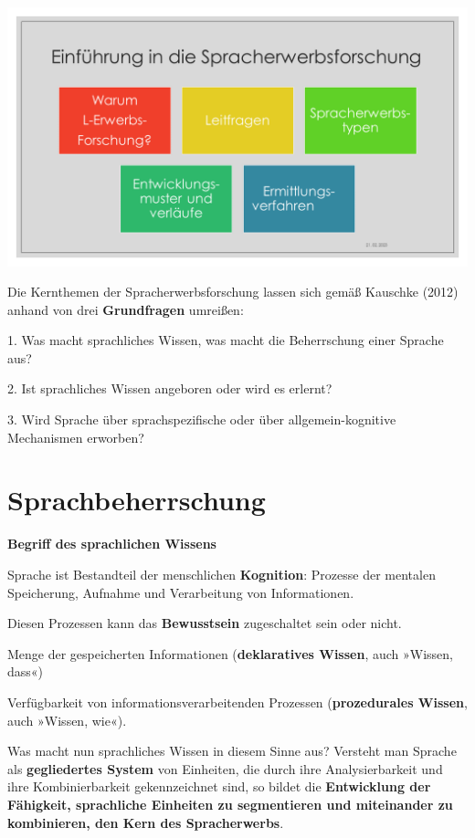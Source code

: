 \documentclass[
  letterpaper,
]{scrbook}
\begin{document}
\includegraphics[width=1\textwidth,height=\textheight]{./pictures/UJ_Intro_2023_02.png}

Die Kernthemen der Spracherwerbsforschung lassen sich gemäß Kauschke
(2012) anhand von drei \textbf{Grundfragen} umreißen:

1. Was macht sprachliches Wissen, was macht die Beherrschung einer
Sprache aus?

2. Ist sprachliches Wissen angeboren oder wird es erlernt?

3. Wird Sprache über sprachspezifische oder über allgemein-kognitive
Mechanismen erworben?

\hypertarget{sprachbeherrschung}{%
\section{Sprachbeherrschung}\label{sprachbeherrschung}}

\textbf{Begriff des sprachlichen Wissens}

Sprache ist Bestandteil der menschlichen \textbf{Kognition}: Prozesse
der mentalen Speicherung, Aufnahme und Verarbeitung von Informationen.

Diesen Prozessen kann das \textbf{Bewusstsein} zugeschaltet sein oder
nicht.

Menge der gespeicherten Informationen (\textbf{deklaratives Wissen},
auch »Wissen, dass«)

Verfügbarkeit von informationsverarbeitenden Prozessen
(\textbf{prozedurales Wissen}, auch »Wissen, wie«).

Was macht nun sprachliches Wissen in diesem Sinne aus? Versteht man
Sprache als \textbf{gegliedertes System} von Einheiten, die durch ihre
Analysierbarkeit und ihre Kombinierbarkeit gekennzeichnet sind, so
bildet die \textbf{Entwicklung der Fähigkeit, sprachliche Einheiten zu
segmentieren und miteinander zu kombinieren, den Kern des
Spracherwerbs}.
\end{document}
